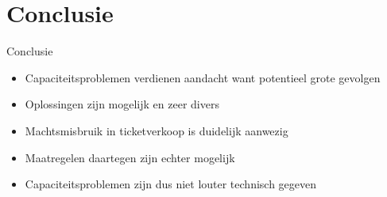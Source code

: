\documentclass{beamer}
\begin{document}
\section{Conclusie}
\begin{frame}{Conclusie}
    \Large{    
        \begin{itemize}
            \item Capaciteitsproblemen verdienen aandacht want potentieel grote gevolgen
            \item Oplossingen zijn mogelijk en zeer divers
            \item Machtsmisbruik in ticketverkoop is duidelijk aanwezig
            \item Maatregelen daartegen zijn echter mogelijk
            \item Capaciteitsproblemen zijn dus niet louter technisch gegeven
        \end{itemize}
    }
\end{frame}
\end{document}
